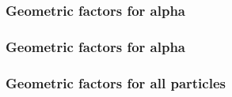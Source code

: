 \documentclass[8pt]{beamer}
\begin{document}
            \begin{frame}
                \frametitle{Geometric factors for alpha}
            
            \end{frame}
            
            \begin{frame}
                \frametitle{Geometric factors for alpha}
            
            \end{frame}
            
            \begin{frame}
                \frametitle{Geometric factors for all particles}
            
            \end{frame}
            
        
\end{document}

